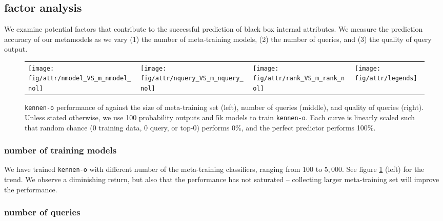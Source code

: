 \documentclass{article} %
\newcommand{\OR}{\texttt{kennen-o}\xspace}
\begin{document}
\subsection{factor analysis}

We examine potential factors that contribute to the successful prediction of black box internal attributes. We measure the prediction accuracy of our metamodels as we vary (1) the number of meta-training models, (2) the number of queries, and (3) the quality of query output.

\begin{figure}
\begin{centering}
\setlength{\tabcolsep}{1em}
\begin{tabular}{ >{\centering\arraybackslash} m{9em} >{\centering\arraybackslash} m{9em}  >{\centering\arraybackslash} m{9em}  >{\centering\arraybackslash} m{3em} }
\texttt{[image: fig/attr/nmodel\_VS\_m\_nmodel\_nol]}
&
\texttt{[image: fig/attr/nquery\_VS\_m\_nquery\_nol]}
&
\texttt{[image: fig/attr/rank\_VS\_m\_rank\_nol]}
&
\texttt{[image: fig/attr/legends]}
\end{tabular}
\par\end{centering}
\vspace{-1em}
\caption{\label{fig:attr-quality-quantity-query}\OR performance of against the size of meta-training set (left), number of queries (middle), and quality of queries (right). Unless stated otherwise, we use 100 probability outputs and 5k models to train \OR. Each curve is linearly scaled such that random chance (0 training data, 0 query, or top-0) performs 0\%, and the perfect predictor performs 100\%. 
}
\end{figure}

\subsubsection*{number of training models}

We have trained \OR with different number of the meta-training classifiers, ranging from 100 to $5,000$. See figure \ref{fig:attr-quality-quantity-query} (left) for the trend. We observe a diminishing return, but also that the performance has not saturated -- collecting larger meta-training set will improve the performance.

\subsubsection*{number of queries}
\end{document}

